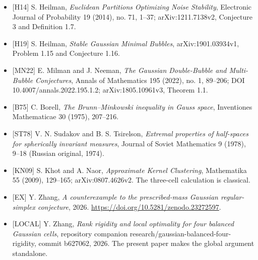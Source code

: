 \documentclass[
  11pt,
]{article}
\providecommand{\tightlist}{%
  \setlength{\itemsep}{0pt}\setlength{\parskip}{0pt}}
\begin{document}
\begin{itemize}
\tightlist
\item
  {[}H14{]} S. Heilman, \emph{Euclidean Partitions Optimizing Noise
  Stability}, Electronic Journal of Probability 19 (2014), no. 71,
  1--37; arXiv:1211.7138v2, Conjecture 3 and Definition 1.7.
\item
  {[}H19{]} S. Heilman, \emph{Stable Gaussian Minimal Bubbles},
  arXiv:1901.03934v1, Problem 1.15 and Conjecture 1.16.
\item
  {[}MN22{]} E. Milman and J. Neeman, \emph{The Gaussian Double-Bubble
  and Multi-Bubble Conjectures}, Annals of Mathematics 195 (2022), no.
  1, 89--206; DOI 10.4007/annals.2022.195.1.2; arXiv:1805.10961v3,
  Theorem 1.1.
\item
  {[}B75{]} C. Borell, \emph{The Brunn--Minkowski inequality in Gauss
  space}, Inventiones Mathematicae 30 (1975), 207--216.
\item
  {[}ST78{]} V. N. Sudakov and B. S. Tsirelson, \emph{Extremal
  properties of half-spaces for spherically invariant measures}, Journal
  of Soviet Mathematics 9 (1978), 9--18 (Russian original, 1974).
\item
  {[}KN09{]} S. Khot and A. Naor, \emph{Approximate Kernel Clustering},
  Mathematika 55 (2009), 129--165; arXiv:0807.4626v2. The three-cell
  calculation is classical.
\item
  {[}EX{]} Y. Zhang, \emph{A counterexample to the
  prescribed-mass Gaussian regular-simplex conjecture}, 2026. \url{https://doi.org/10.5281/zenodo.23272597}.
\item
  {[}LOCAL{]} Y. Zhang, \emph{Rank rigidity and local
  optimality for four balanced Gaussian cells}, repository companion
  research/gaussian-balanced-four-rigidity, commit b627062, 2026. The
  present paper makes the global argument standalone.
\end{itemize}
\end{document}
